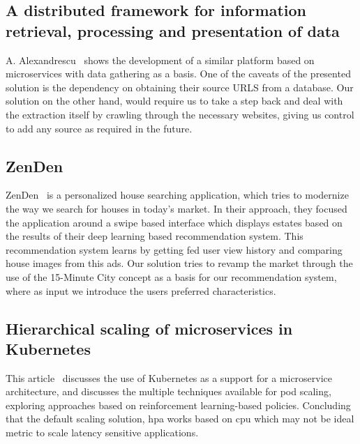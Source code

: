 \subsection{A distributed framework for information retrieval, processing and presentation of data}
A. Alexandrescu~\cite{alexandrescu2018distributed} shows the development of a similar platform based on microservices with data gathering as a basis. One of the caveats of the presented solution is the dependency on obtaining their source URLS from a database. Our solution on the other hand, would require us to take a step back and deal with the extraction itself by crawling through the necessary websites, giving us control to add any source as required in the future.

\subsection{ZenDen}
ZenDen~\cite{zenden} is a personalized house searching application, which tries to modernize the way we search for houses in today's market. In their approach, they focused the application around a swipe based interface which displays estates based on the results of their deep learning based recommendation system. This recommendation system learns by getting fed user view history and comparing house images from this ads. Our solution tries to revamp the market through the use of the 15-Minute City concept as a basis for our recommendation system, where as input we introduce the users preferred characteristics. 

\subsection{Hierarchical scaling of microservices in Kubernetes}

This article~\cite{rossi2020hierarchical} discusses the use of Kubernetes as a support for a microservice architecture, and discusses the multiple techniques available for pod scaling, exploring approaches based on reinforcement learning-based policies. Concluding that the default scaling solution, \acrfull{hpa} works based on \acrfull{cpu} which may not be ideal metric to scale latency sensitive applications.
